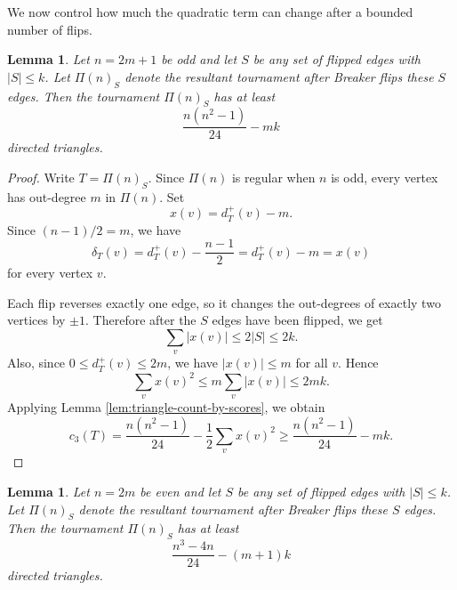 \documentclass{article}
\theoremstyle{definition}
\theoremstyle{plain}
\newtheorem{lem}[theo]{Lemma}
\theoremstyle{remark}
\theoremstyle{definition}
\begin{document}
We now control how much the quadratic term can change after a bounded number of flips.


\begin{lem}\label{lem:delta-sq-odd}
Let $n=2m+1$ be odd and let $S$ be any set of flipped edges with $|S|\le k$. Let $\Pi(n)_S$ denote the resultant tournament after Breaker flips these $S$ edges.
Then the tournament $\Pi(n)_S$ has at least
\[
\frac{n(n^2-1)}{24}-mk
\]
directed triangles.

\end{lem}

\begin{proof}
Write $T=\Pi(n)_S$.
Since $\Pi(n)$ is regular when $n$ is odd, every vertex has out-degree $m$ in $\Pi(n)$.
Set
\[
x(v)=d_T^+(v)-m.
\]
Since $(n-1)/2=m$, we have
\[
\delta_T(v)=d_T^+(v)-\frac{n-1}{2}=d_T^+(v)-m=x(v)
\]
for every vertex $v$.

Each flip reverses exactly one edge, so it changes the out-degrees of exactly two vertices by $\pm1$.
Therefore after the $S$ edges have been flipped, we get
\[
\sum_v |x(v)|\le 2|S|\le 2k.
\]
Also, since $0\le d_T^+(v)\le 2m$, we have $|x(v)|\le m$ for all $v$.
Hence
\[
\sum_v x(v)^2\le m\sum_v |x(v)|\le 2mk.
\]
Applying Lemma \ref{lem:triangle-count-by-scores}, we obtain
\[
c_3(T)
=
\frac{n(n^2-1)}{24}
-
\frac12\sum_v x(v)^2
\ge
\frac{n(n^2-1)}{24}
-mk.
\]
\end{proof}

\begin{lem}\label{lem:delta-sq-even}
Let $n=2m$ be even and let $S$ be any set of flipped edges with $|S|\le k$. Let $\Pi(n)_S$ denote the resultant tournament after Breaker flips these $S$ edges.
Then the tournament $\Pi(n)_S$ has at least
\[
\frac{n^3-4n}{24}-(m+1)k
\]
directed triangles.
\end{lem}
\end{document}
